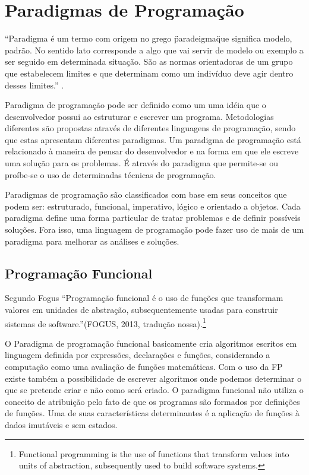 \chapter{Paradigmas de Programação}

\vspace{-1.9cm}

``Paradigma é um termo com origem no grego \"paradeigma\" que significa modelo, padrão. No sentido lato corresponde a algo que vai servir de modelo ou exemplo a ser seguido em determinada situação. São as normas orientadoras de um grupo que estabelecem limites e que determinam como um indivíduo deve agir dentro desses limites.'' \cite{Significados:2013}.

Paradigma de programação pode ser definido como um uma idéia que o desenvolvedor possui ao estruturar e escrever um programa. Metodologias diferentes são propostas através de diferentes linguagens de programação, sendo que estas apresentam diferentes paradigmas. Um paradigma de programação está relacionado à maneira de pensar do desenvolvedor e na forma em que ele escreve uma solução para os problemas. É através do paradigma que permite-se ou proíbe-se o uso de determinadas técnicas de programação.

Paradigmas de programação são classificados com base em seus conceitos que podem ser: estruturado, funcional, imperativo, lógico e orientado a objetos. Cada paradigma define uma forma particular de tratar problemas e de definir possíveis soluções. Fora isso, uma linguagem de programação pode fazer uso de mais de um paradigma para melhorar as análises e soluções.

\section{Programação Funcional}

  Segundo Fogus ``Programação funcional é o uso de funções que transformam valores em unidades de abstração, subsequentemente usadas para construir sistemas de software.''(FOGUS, 2013, tradução nossa).\nocite{FuncJS:2013}\footnote{Functional programming is the use of functions that transform values into units of abstraction, subsequently used to build software systems.}

  O Paradigma de programação funcional basicamente cria algoritmos escritos em linguagem definida por expressões, declarações e funções, considerando a computação como uma avaliação de funções matemáticas. Com o uso da \ac{FP} existe também a possibilidade de escrever algoritmos onde podemos determinar o que se pretende criar e não como será criado. O paradigma funcional não utiliza o conceito de atribuição pelo fato de que os programas são formados por definições de funções. Uma de suas características determinantes é a aplicação de funções à dados imutáveis e sem estados.

